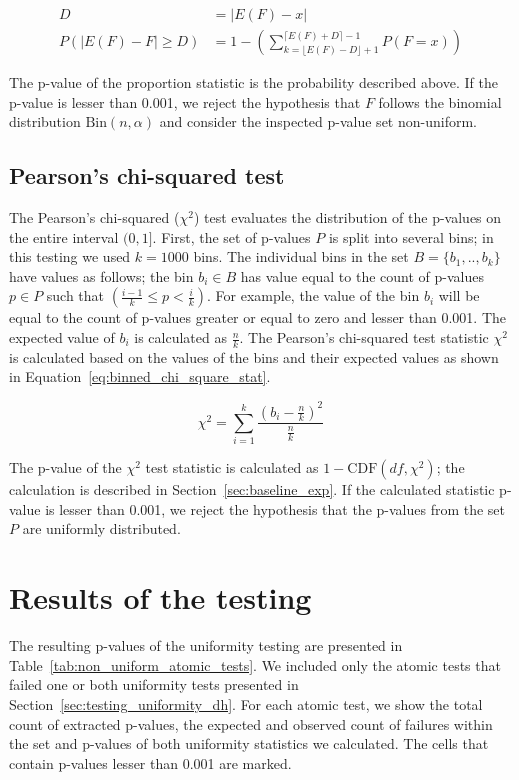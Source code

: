 \documentclass[
	digital,    %
	oneside,    %
	color,
	11pt,
	nocover,
	notable,
	nolof,
	nolot,
]{fithesis3}
\theoremstyle{definition}
\theoremstyle{remark}
\begin{document}
\begin{align}
D &= \lvert E(F) - x \rvert \\
\label{eq:prop_statistic}
P(\lvert E(F) - F \rvert \geq D) &= 1 - \left( \sum\limits_{k=\lfloor E(F)-D \rfloor + 1}^{\lceil E(F)+D \rceil - 1} P(F = x) \right)
\end{align}

The p-value of the proportion statistic is the probability described above. If the p-value is lesser than 0.001, we reject the hypothesis that $F$ follows the binomial distribution $\text{Bin}(n,\alpha)$ and consider the inspected p-value set non-uniform.


\subsection{Pearson's chi-squared test}
The Pearson's chi-squared ($\chi^2$) test evaluates the distribution of the p-values on the entire interval $(0,1]$. First, the set of p-values $P$ is split into several bins; in this testing we used $k=1000$ bins. The individual bins in the set $B = \{b_1,..,b_k\}$ have values as follows; the bin $b_i \in B$ has value equal to the count of p-values $p \in P$ such that $\left(\frac{i-1}{k} \leq p < \frac{i}{k}\right)$. For example, the value of the bin $b_i$ will be equal to the count of p-values greater or equal to zero and lesser than 0.001. The expected value of $b_i$ is calculated as $\frac{n}{k}$. The Pearson's chi-squared test statistic $\chi^2$ is calculated based on the values of the bins and their expected values as shown in Equation~\ref{eq:binned_chi_square_stat}.

\begin{equation}
\label{eq:binned_chi_square_stat}
\chi^2 = \sum\limits_{i=1}^{k} \frac{ \left( b_i - \frac{n}{k} \right)^{2} }{\frac{n}{k}}
\end{equation}

The p-value of the $\chi^2$ test statistic is calculated as $1-\text{CDF}(df, \chi^2)$; the calculation is described in Section~\ref{sec:baseline_exp}. If the calculated statistic p-value is lesser than 0.001, we reject the hypothesis that the p-values from the set $P$ are uniformly distributed.

\section{Results of the testing}
The resulting p-values of the uniformity testing are presented in Table~\ref{tab:non_uniform_atomic_tests}. We included only the atomic tests that failed one or both uniformity tests presented in Section~\ref{sec:testing_uniformity_dh}. For each atomic test, we show the total count of extracted p-values, the expected and observed count of failures within the set and p-values of both uniformity statistics we calculated. The cells that contain p-values lesser than 0.001 are marked.
\end{document}
